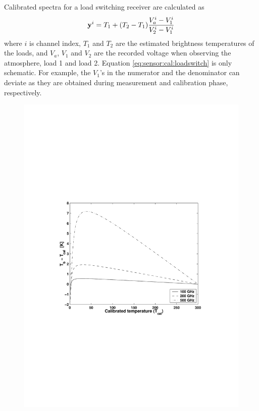  Calibrated spectra for a load switching receiver are calculated as
 \begin{equation}
   \mathbf{y}^i = T_1 + (T_2-T_1)\frac{V_a^i-V_1^i}{V_2^i-V_1^i}
   \label{eq:sensor:cal:loadswitch}
 \end{equation}
 where $i$ is channel index, $T_1$ and $T_2$ are the estimated
 brightness temperatures of the loads, and $V_a$, $V_1$ and $V_2$ are
 the recorded voltage when observing the atmosphere, load 1 and load
 2. Equation \ref{eq:sensor:cal:loadswitch} is only schematic. For
 example, the $V_1$'s in the numerator and the denominator can deviate
 as they are obtained during measurement and calibration phase,
 respectively.

 \begin{figure}[t]
  \begin{center}
   \begin{minipage}{0.50\textwidth}
    \centering
    \includegraphics*[width=0.99\hsize]{Figs/fig_calerror_tb_1}

\end{minipage}
\end{center}
\end{figure}

